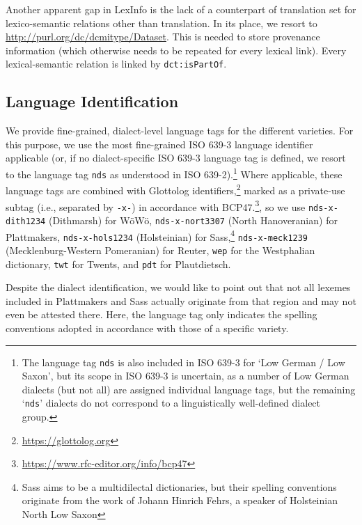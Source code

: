 \documentclass[11pt]{article}
\newcommand{\code}[1]{\texttt{#1}} %
\newcommand{\onto}[1]{\texttt{#1}} %
\begin{document}
\begin{enumerate}
Another apparent gap in LexInfo is the lack of a counterpart of translation set for lexico-semantic relations other than translation. In its place, we resort to \url{http://purl.org/dc/dcmitype/Dataset}. This is needed to store provenance information (which otherwise needs to be repeated for every lexical link). Every lexical-semantic relation is linked by \onto{dct:isPartOf}.

\subsection{Language Identification}

We provide fine-grained, dialect-level language tags for the different varieties. For this purpose, we use the most fine-grained ISO 639-3 language identifier applicable (or, if no dialect-specific ISO 639-3 language tag is defined, we resort to the language tag \code{nds} as understood in ISO 639-2).\footnote{
    The language tag \code{nds} is also included in ISO 639-3 for `Low German / Low Saxon', but its scope in ISO 639-3 is uncertain, as a number of Low German dialects (but not all) are assigned individual language tags, but the remaining `\code{nds}' dialects do not correspond to a linguistically well-defined dialect group.
} 
Where applicable, these language tags are combined with Glottolog identifiers,\footnote{\url{https://glottolog.org}} marked as a private-use subtag (i.e., separated by \code{-x-}) in accordance with BCP47.\footnote{\url{https://www.rfc-editor.org/info/bcp47}}, so we use 
\code{nds-x-dith1234} (Dithmarsh) for WöWö,
\code{nds-x-nort3307} (North Hanoveranian) for Plattmakers,
\code{nds-x-hols1234} (Holsteinian) for Sass,\footnote{
    Sass aims to be a multidilectal dictionaries, but their spelling conventions originate from the work of Johann Hinrich Fehrs, a speaker of Holsteinian North Low Saxon
}
\code{nds-x-meck1239} (Mecklenburg-Western Pomeranian) for Reuter,
\code{wep} for the Westphalian dictionary,
\code{twt} for Twents, and
\code{pdt} for Plautdietsch.

Despite the dialect identification, we would like to point out that not all lexemes included in Plattmakers and Sass actually originate from that region and may not even be attested there. Here, the language tag only indicates the spelling conventions adopted in accordance with those of a specific variety.


\end{enumerate}
\end{document}
